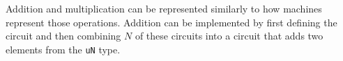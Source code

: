 Addition and multiplication can be represented similarly to how machines represent those operations. Addition can be implemented by first defining the  circuit and then combining $N$ of  these circuits into a circuit that adds two elements from the \texttt{uN} type.

